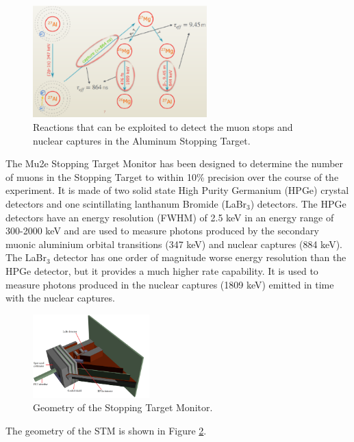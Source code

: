 \begin{figure}[!h]
    \centering
    \includegraphics[width =0.6\textwidth]{figures/png/Screenshot_20240706_094517.png}
    \caption[The muon stops 
    and nuclear captures detection in Al ST.]{Reactions that can be exploited to detect the muon stops 
    and nuclear captures in the Aluminum Stopping Target.}
    \label{fig:stmprocess}
    \end{figure}

    The Mu2e Stopping Target Monitor has been designed to determine the number of 
    muons in the Stopping Target to within 10\% precision over the course of the experiment.  
    It is made of two solid state High Purity Germanium (HPGe) crystal detectors and one 
    scintillating lanthanum Bromide (LaBr$_3$) detectors. The HPGe detectors have an 
    energy resolution (FWHM) of 2.5 keV in an energy range of 300-2000 keV and are used 
    to measure photons produced by the secondary muonic aluminium orbital transitions 
    (347 keV) and nuclear captures (884 keV). The LaBr$_3$ detector has one order of 
    magnitude worse energy resolution than the HPGe detector, but it provides a much 
    higher rate capability. It is used to measure photons produced in the nuclear captures 
    (1809 keV) emitted in time with the nuclear captures.  
    \begin{figure}[!h]
        \centering
        \includegraphics[width =0.4\textwidth]{figures/png/Setup.png}
        \caption[The gemetry of the Stopping Target Monitor.]{Geometry of the Stopping Target Monitor.}
        \label{fig:stmfigure}
        \end{figure}
The geometry of the STM is shown in Figure \ref{fig:stmfigure}.




